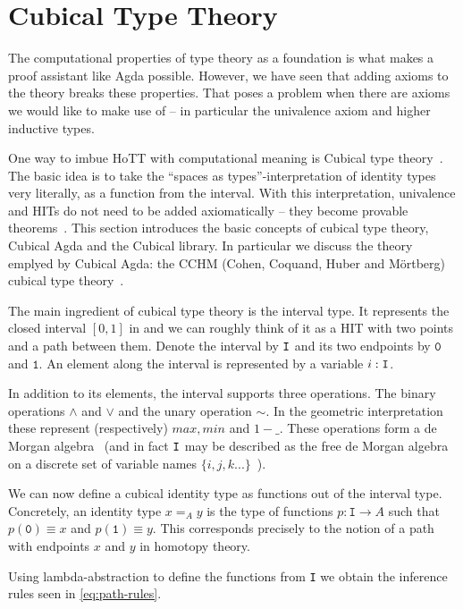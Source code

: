 \section{Cubical Type Theory}\label{sec:cubical}

The computational properties of type theory as a foundation is what makes a proof
assistant like Agda possible. However, we have seen that adding axioms to the
theory breaks these properties. That poses a problem when there are axioms we would
like to make use of -- in particular the univalence axiom and higher inductive types.

One way to imbue HoTT with computational meaning is Cubical type theory~\cite{cohen2016cubical}.
The basic idea is to take the ``spaces as types''-interpretation of identity types very literally, as
a function from the interval. With this interpretation, univalence and HITs do not need to
be added axiomatically -- they become provable theorems~\cite{coquand2018higher}.
This section introduces the basic concepts of cubical type theory, Cubical Agda and the
Cubical library. In particular we discuss the theory emplyed by Cubical Agda:
the CCHM (Cohen, Coquand, Huber and M\"ortberg) cubical type theory~\cite{cohen2016cubical}.

The main ingredient of cubical type theory is the interval type. It represents
the closed interval $[0,1]$ in and we can roughly think of it as a HIT with two points
and a path between them. Denote the interval by $\texttt{I}$ and its two
endpoints by $\texttt{0}$ and $\texttt{1}$. An element along the interval is
represented by a variable $i : \texttt{I}$.

In addition to its elements, the interval supports three operations. The binary
operations $\land$ and $\lor$ and the unary operation $\sim$. In the geometric
interpretation these represent (respectively) $max, min$ and $1 - \_$. These
operations form a de Morgan algebra~\cite{mortberg2020cubical} (and in fact
$\texttt{I}$ may be described as the free de Morgan algebra on a discrete set of
variable names $\{i, j, k ...\}$~\cite{cohen2016cubical}).

We can now define a cubical identity type as functions out of the interval type.
Concretely, an identity type $x =_A y$ is the type of functions $p : \texttt{I}
\rightarrow A$ such that $p(\texttt{0}) \equiv x$ and $p(\texttt{1}) \equiv y$.
This corresponds precisely to the notion of a path with endpoints $x$ and $y$ in
homotopy theory.

Using lambda-abstraction to define the functions from \texttt{I} we obtain the inference rules
seen in \autoref{eq:path-rules}.


